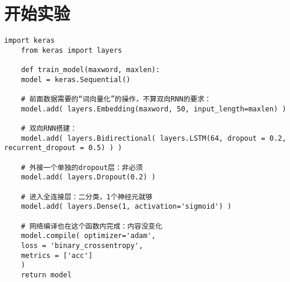 \section{开始实验}
\zhlipsum[2]\cite{HPC}

\begin{lstlisting}[caption = cs代码表测试]
	import keras
	from keras import layers
	
	def train_model(maxword, maxlen):
	model = keras.Sequential()
	
	# 前面数据需要的“词向量化”的操作，不算双向RNN的要求：
	model.add( layers.Embedding(maxword, 50, input_length=maxlen) )
	
	# 双向RNN搭建：
	model.add( layers.Bidirectional( layers.LSTM(64, dropout = 0.2, recurrent_dropout = 0.5) ) )
	
	# 外接一个单独的dropout层：非必须
	model.add( layers.Dropout(0.2) )
	
	# 进入全连接层：二分类，1个神经元就够
	model.add( layers.Dense(1, activation='sigmoid') )
	
	# 网络编译也在这个函数内完成：内容没变化
	model.compile( optimizer='adam',
	loss = 'binary_crossentropy',
	metrics = ['acc']
	) 
	return model
\end{lstlisting}